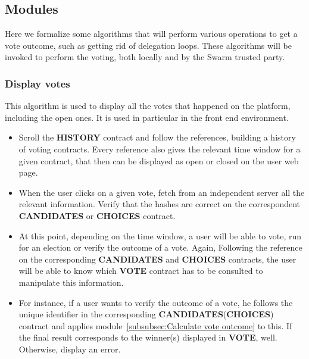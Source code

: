 \documentclass[submission, copyright,creativecommons,sharealike,noncommercial]{eptcs}
\newcommand{\Candidates}{\textbf{CANDIDATES}\xspace}
\newcommand{\Choices}{\textbf{CHOICES}\xspace}
\newcommand{\Vote}{\textbf{VOTE}\xspace}
\newcommand{\History}{\textbf{HISTORY}\xspace}
\begin{document}
\subsection{Modules}\label{subsec:Modules}
	Here we formalize some algorithms that will perform various operations to get a vote outcome, such as getting rid of delegation loops. These algorithms will be invoked to perform the voting, both locally and by the Swarm trusted party.
	
\subsubsection{Display votes}\label{subsubsec:Display votes}
	This algorithm is used to display all the votes that happened on the platform, including the open ones. It is used in particular in the front end environment.
	\begin{itemize}
		\item Scroll the \History contract and follow the references, building a history of voting contracts. Every reference also gives the relevant time window for a given contract, that then can be displayed as open or closed on the user web page.
		
		\item When the user clicks on a given vote, fetch from an independent server all the relevant information. Verify that the hashes are correct on the correspondent \Candidates or \Choices contract.
		
		\item At this point, depending on the time window, a user will be able to vote, run for an election or verify the outcome of a vote. Again, Following the reference on the corresponding \Candidates and \Choices contracts, the user will be able to know which \Vote contract has to be consulted to manipulate this information.
		
		\item For instance, if a user wants to verify the outcome of a vote, he follows the unique identifier in the corresponding \Candidates (\Choices) contract and applies module~\ref{subsubsec:Calculate vote outcome} to this. If the final result corresponds to the winner(s) displayed in \Vote, well. Otherwise, display an error.
	\end{itemize}
\end{document}
